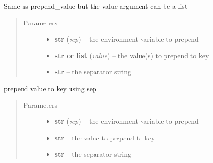 \documentclass[a4paper,10pt,english]{sphinxmanual}
\begin{document}
\begin{fulllineitems}
\begin{fulllineitems}
\begin{quote}
\begin{description}
\end{description}\end{quote}

\end{fulllineitems}


\begin{fulllineitems}
\label{commands/apidoc/src:src.environment.Environ.prepend}
Same as prepend\_value but the value argument can be a list
\begin{quote}\begin{description}
\item[{Parameters}] \leavevmode\begin{itemize}
\item {} 
\textbf{str} (\emph{sep}) -- the environment variable to prepend

\item {} 
\textbf{str or list} (\emph{value}) -- the value(s) to prepend to key

\item {} 
\textbf{str} -- the separator string

\end{itemize}

\end{description}\end{quote}

\end{fulllineitems}


\begin{fulllineitems}
\label{commands/apidoc/src:src.environment.Environ.prepend_value}
prepend value to key using sep
\begin{quote}\begin{description}
\item[{Parameters}] \leavevmode\begin{itemize}
\item {} 
\textbf{str} (\emph{sep}) -- the environment variable to prepend

\item {} 
\textbf{str} -- the value to prepend to key

\item {} 
\textbf{str} -- the separator string


\end{itemize}
\end{description}
\end{quote}
\end{fulllineitems}
\end{fulllineitems}
\end{document}
